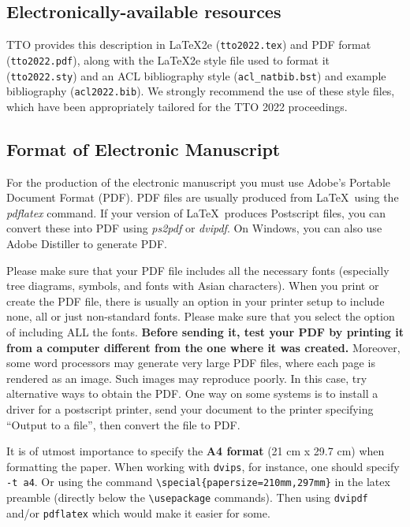 \documentclass[11pt,a4paper]{article}
\begin{document}
\subsection{Electronically-available resources}

TTO provides this description in \LaTeX2e{} (\texttt{\small tto2022.tex}) and PDF
format (\texttt{\small tto2022.pdf}), along with the \LaTeX2e{} style file used to
format it (\texttt{\small tto2022.sty}) and an ACL bibliography style (\texttt{\small acl\_natbib.bst})
and example bibliography (\texttt{\small acl2022.bib}).
 We
strongly recommend the use of these style files, which have been
appropriately tailored for the TTO 2022 proceedings.

\subsection{Format of Electronic Manuscript}
\label{sect:pdf}

For the production of the electronic manuscript you must use Adobe's
Portable Document Format (PDF). PDF files are usually produced from
\LaTeX\ using the \textit{pdflatex} command. If your version of
\LaTeX\ produces Postscript files, you can convert these into PDF
using \textit{ps2pdf} or \textit{dvipdf}. On Windows, you can also use
Adobe Distiller to generate PDF.

Please make sure that your PDF file includes all the necessary fonts
(especially tree diagrams, symbols, and fonts with Asian
characters). When you print or create the PDF file, there is usually
an option in your printer setup to include none, all or just
non-standard fonts.  Please make sure that you select the option of
including ALL the fonts. \textbf{Before sending it, test your PDF by
  printing it from a computer different from the one where it was
  created.} Moreover, some word processors may generate very large PDF
files, where each page is rendered as an image. Such images may
reproduce poorly. In this case, try alternative ways to obtain the
PDF. One way on some systems is to install a driver for a postscript
printer, send your document to the printer specifying ``Output to a
file'', then convert the file to PDF.

It is of utmost importance to specify the \textbf{A4 format} (21 cm
x 29.7 cm) when formatting the paper. When working with
\texttt{dvips}, for instance, one should specify \texttt{-t a4}.
Or using the command \verb|\special{papersize=210mm,297mm}| in the latex
preamble (directly below the \verb|\usepackage| commands). Then using 
\texttt{dvipdf} and/or \texttt{pdflatex} which would make it easier for some.
\end{document}
